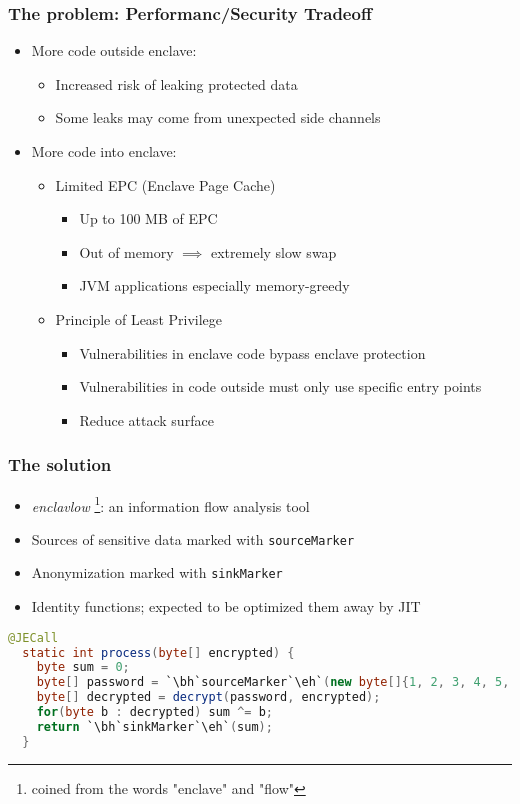 \documentclass{beamer}
\newcommand{\code}[1]{\colorbox{code}{\texttt{\footnotesize #1}}}
\newcounter{highlight}[page]
\newcommand{\tikzhighlightanchor}[1]{\ensuremath{\vcenter{\hbox{\tikz[remember picture, overlay]{\coordinate (#1 highlight \arabic{highlight});}}}}}
\newcommand{\bh}[0]{\stepcounter{highlight}\tikzhighlightanchor{begin}}
\newcommand{\eh}[0]{\tikzhighlightanchor{end}}
\begin{document}
\begin{frame}[t]
  \frametitle{The problem: Performanc/Security Tradeoff}
  \begin{itemize}
    \item More code outside enclave:
      \begin{itemize}
        \item Increased risk of leaking protected data
        \item Some leaks may come from unexpected side channels
      \end{itemize}
    \item More code into enclave:
      \begin{itemize}
        \item Limited EPC (Enclave Page Cache)
          \begin{itemize}
            \item Up to 100 MB of EPC
            \item Out of memory $\implies$ extremely slow swap
            \item JVM applications especially memory-greedy
          \end{itemize}
        \item Principle of Least Privilege
          \begin{itemize}
            \item Vulnerabilities in enclave code bypass enclave protection
            \item Vulnerabilities in code outside must only use specific entry points
            \item Reduce attack surface
          \end{itemize}
      \end{itemize}
  \end{itemize}
\end{frame}

\begin{frame}[fragile]
  \frametitle{The solution}
  \begin{itemize}
    \item \textit{enclavlow} \footnote{coined from the words "enclave" and "flow"}:
      an information flow analysis tool
    \item Sources of sensitive data marked with \code{sourceMarker}
    \item Anonymization marked with \code{sinkMarker}
    \item Identity functions; expected to be optimized them away by JIT
  \end{itemize}

  \begin{lstlisting}[style=j, language=java]
  @JECall
  static int process(byte[] encrypted) {
    byte sum = 0;
    byte[] password = `\bh`sourceMarker`\eh`(new byte[]{1, 2, 3, 4, 5, 6});
    byte[] decrypted = decrypt(password, encrypted);
    for(byte b : decrypted) sum ^= b;
    return `\bh`sinkMarker`\eh`(sum);
  }
  \end{lstlisting}
\end{frame}
\end{document}
